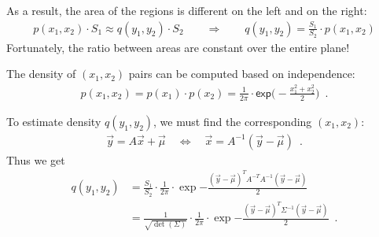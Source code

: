 \documentclass[landscape,footrule]{foils}
\newcommand{\lastline}{\vspace*{-2ex}}
\begin{document}
As a result, the area of the regions is different on the left and on the right:
\begin{align*}
p(x_1,x_2)\cdot S_1\approx q(y_1,y_2)\cdot S_2\qquad\Longrightarrow\qquad q(y_1,y_2)={\frac{S_1}{S_2}}\cdot p(x_1,x_2) 
\end{align*}
Fortunately, the ratio between areas are constant over the entire plane!\lastline

  

\enlargethispage{1cm}
The density of $(x_1,x_2)$ pairs can be computed based on independence:
\begin{align*}
p(x_1,x_2)=p(x_1)\cdot p(x_2)=\frac{1}{2\pi}\cdot\mathsf{exp}\Biggl(-\frac{x_1^2+x_2^2}{2}\Biggl)\enspace.
\end{align*}
\vspace*{-3ex}

To estimate density $q(y_1,y_2)$, we must find the corresponding $(x_1,x_2)$:
\begin{align*}
 \vec{y}=A\vec{x}+\vec{\mu}\quad\Leftrightarrow\quad \vec{x}=A^{-1}(\vec{y}-\vec{\mu})\enspace. 
\end{align*}
Thus we get \vspace*{-2ex}
\begin{align*}
q(y_1,y_2)&=\frac{S_1}{S_2}\cdot\frac{1}{2\pi}\cdot
\exp{-\frac{(\vec{y}-\vec{\mu})^T A^{-T}A^{-1}(\vec{y}-\vec{\mu})}{2}}\\
&=\frac{1}{\sqrt{\det(\Sigma)}}\cdot\frac{1}{2\pi}\cdot
\exp{-\frac{(\vec{y}-\vec{\mu})^T \Sigma^{-1}(\vec{y}-\vec{\mu})}{2}}\enspace.
\end{align*}

 

 
\end{document}
